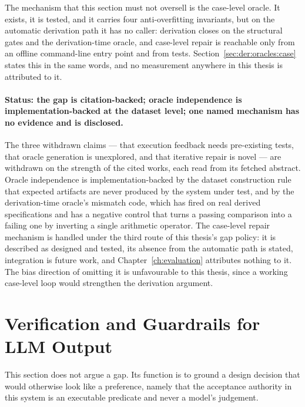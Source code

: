 The mechanism that this section must not oversell is the case-level oracle. It exists, it is
tested, and it carries four anti-overfitting invariants, but on the automatic derivation path it
has no caller: derivation closes on the structural gates and the derivation-time oracle, and
case-level repair is reachable only from an offline command-line entry point and from tests.
Section~\ref{sec:der:oracles:case} states this in the same words, and no measurement anywhere in
this thesis is attributed to it.

\paragraph{Status: the gap is citation-backed; oracle independence is implementation-backed at
the dataset level; one named mechanism has no evidence and is disclosed.}
The three withdrawn claims --- that execution feedback needs pre-existing tests, that oracle
generation is unexplored, and that iterative repair is novel --- are withdrawn on the strength
of the cited works, each read from its fetched abstract. Oracle independence is
implementation-backed by the dataset construction rule that expected artifacts are never
produced by the system under test, and by the derivation-time oracle's mismatch code, which has
fired on real derived specifications and has a negative control that turns a passing comparison
into a failing one by inverting a single arithmetic operator. The case-level repair mechanism is
handled under the third route of this thesis's gap policy: it is described as designed and
tested, its absence from the automatic path is stated, integration is future work, and
Chapter~\ref{ch:evaluation} attributes nothing to it. The bias direction of omitting it is
unfavourable to this thesis, since a working case-level loop would strengthen the derivation
argument.

\section{Verification and Guardrails for LLM Output}
\label{sec:rel:verification}

This section does not argue a gap. Its function is to ground a design decision that would
otherwise look like a preference, namely that the acceptance authority in this system is an
executable predicate and never a model's judgement.

